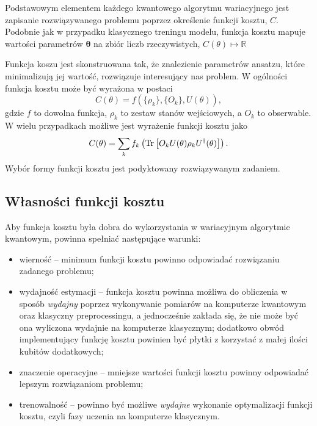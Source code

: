 \documentclass[a4paper,11pt]{article}
\newcommand{\tr}[1]{\ensuremath{\mathrm{Tr} #1}}
\newcommand{\R}{\mathbb{R}}
\begin{document}
Podstawowym elementem każdego kwantowego algorytmu wariacyjnego jest zapisanie rozwiązywanego problemu poprzez określenie funkcji kosztu, $C$. Podobnie jak w przypadku klasycznego treningu modelu, funkcja kosztu mapuje wartości parametrów $\mathbf{\theta}$ na zbiór liczb rzeczywistych, $C(\theta)\mapsto \R$


Funkcja koszu jest skonstruowana tak, że znalezienie parametrów ansatzu, które minimalizują jej wartość, rozwiązuje interesujący nas problem.  W ogólności funkcja kosztu może być wyrażona w postaci
\begin{equation}
	C(\theta)  = f(\{\rho_k\}, \{O_k\}, U(\theta)),
\end{equation}
gdzie $f$ to dowolna funkcja, $\rho_k$ to zestaw stanów wejściowych, a $O_k$ to obserwable. W wielu przypadkach możliwe jest wyrażenie funkcji kosztu jako
\begin{equation}
	C(\theta) = \sum_kf_k\left(\tr\left[ O_k U(\theta) \rho_k U^\dagger(\theta)\right] \right).
\end{equation}
Wybór formy funkcji kosztu jest podyktowany rozwiązywanym zadaniem.

\subsection{Własności funkcji kosztu}
Aby funkcja kosztu była dobra do wykorzystania w wariacyjnym algorytmie kwantowym, powinna spełniać następujące warunki:
\begin{itemize}
	\item wierność -- minimum funkcji kosztu powinno odpowiadać rozwiązaniu zadanego problemu;
	\item wydajność estymacji -- funkcja kosztu powinna możliwa do obliczenia w sposób \emph{wydajny} poprzez wykonywanie pomiarów na komputerze kwantowym oraz klasyczny preprocessingu, a jednocześnie zakłada się, że nie może być ona wyliczona wydajnie na komputerze klasycznym; dodatkowo obwód implementujący funkcję kosztu powinien być płytki z korzystać z małej ilości kubitów dodatkowych;
	\item znaczenie operacyjne -- mniejsze wartości funkcji kosztu powinny odpowiadać lepszym rozwiązaniom problemu;
	\item trenowalność -- powinno być możliwe \emph{wydajne} wykonanie optymalizacji funkcji kosztu, czyli fazy uczenia na komputerze klasycznym.
	
\end{itemize}
\end{document}

